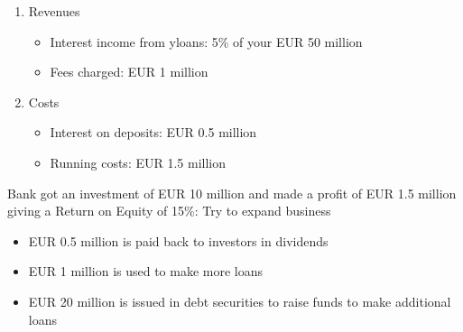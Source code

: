 \documentclass{beamer}
\begin{document}
\begin{frame}  
\begin{enumerate}
  \item Revenues
    \begin{itemize}
      \item Interest income from yloans:  5\% of your EUR 50 million
      \item Fees charged: EUR 1 million
    \end{itemize}
  \item Costs
    \begin{itemize}
      \item Interest on deposits: EUR 0.5 million
      \item Running costs: EUR 1.5 million
    \end{itemize}
\end{enumerate}
\end{frame}
\begin{frame}
\begin{table}[!h] \centering
\caption{Income statement}
\end{table}
\end{frame}
\begin{frame}
 Bank got an investment of EUR 10 million and made a profit of EUR 1.5 million giving a Return on Equity of 15\%:
 Try to expand business
\begin{itemize}
  \item EUR 0.5 million is paid back to investors in dividends
  \item EUR 1 million is used to make more loans
  \item EUR 20 million is issued in debt securities to raise funds to make additional loans
\end{itemize}
\end{frame}
\end{document}
